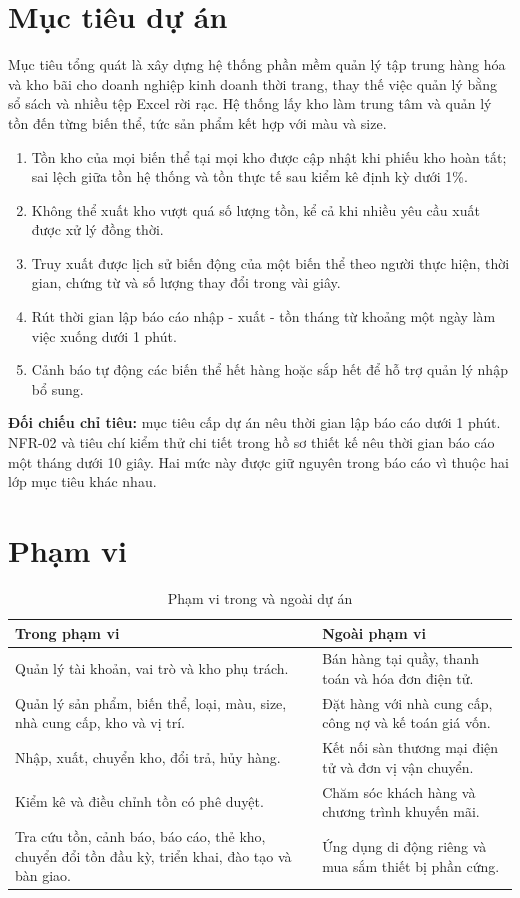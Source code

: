 \documentclass[12pt,a4paper]{report}
\newcommand{\tablehead}[1]{\cellcolor{HUSTBlue}\color{white}\textbf{#1}}
\begin{document}
\section{Mục tiêu dự án}

Mục tiêu tổng quát là xây dựng hệ thống phần mềm quản lý tập trung hàng hóa và kho bãi cho doanh nghiệp kinh doanh thời trang, thay thế việc quản lý bằng sổ sách và nhiều tệp Excel rời rạc. Hệ thống lấy kho làm trung tâm và quản lý tồn đến từng biến thể, tức sản phẩm kết hợp với màu và size.

\begin{enumerate}
\item Tồn kho của mọi biến thể tại mọi kho được cập nhật khi phiếu kho hoàn tất; sai lệch giữa tồn hệ thống và tồn thực tế sau kiểm kê định kỳ dưới 1\%.
\item Không thể xuất kho vượt quá số lượng tồn, kể cả khi nhiều yêu cầu xuất được xử lý đồng thời.
\item Truy xuất được lịch sử biến động của một biến thể theo người thực hiện, thời gian, chứng từ và số lượng thay đổi trong vài giây.
\item Rút thời gian lập báo cáo nhập - xuất - tồn tháng từ khoảng một ngày làm việc xuống dưới 1 phút.
\item Cảnh báo tự động các biến thể hết hàng hoặc sắp hết để hỗ trợ quản lý nhập bổ sung.
\end{enumerate}

\noindent\textbf{Đối chiếu chỉ tiêu:} mục tiêu cấp dự án nêu thời gian lập báo cáo dưới 1 phút. NFR-02 và tiêu chí kiểm thử chi tiết trong hồ sơ thiết kế nêu thời gian báo cáo một tháng dưới 10 giây. Hai mức này được giữ nguyên trong báo cáo vì thuộc hai lớp mục tiêu khác nhau.

\section{Phạm vi}

\begin{table}[H]
\centering
\caption{Phạm vi trong và ngoài dự án}
\small
\begin{tabularx}{\textwidth}{Y Y}
\toprule
\tablehead{Trong phạm vi} & \tablehead{Ngoài phạm vi}\\
\midrule
Quản lý tài khoản, vai trò và kho phụ trách. & Bán hàng tại quầy, thanh toán và hóa đơn điện tử.\\
Quản lý sản phẩm, biến thể, loại, màu, size, nhà cung cấp, kho và vị trí. & Đặt hàng với nhà cung cấp, công nợ và kế toán giá vốn.\\
Nhập, xuất, chuyển kho, đổi trả, hủy hàng. & Kết nối sàn thương mại điện tử và đơn vị vận chuyển.\\
Kiểm kê và điều chỉnh tồn có phê duyệt. & Chăm sóc khách hàng và chương trình khuyến mãi.\\
Tra cứu tồn, cảnh báo, báo cáo, thẻ kho, chuyển đổi tồn đầu kỳ, triển khai, đào tạo và bàn giao. & Ứng dụng di động riêng và mua sắm thiết bị phần cứng.\\
\bottomrule
\end{tabularx}
\end{table}
\end{document}
